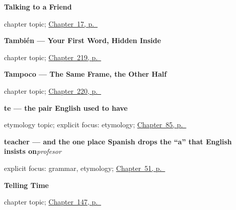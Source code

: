 \noindent\begin{minipage}[t]{\linewidth}
\raggedright
\textbf{Talking to a Friend}\par
\footnotesize chapter topic; \hyperref[ch:hablas]{Chapter~17, p.~\pageref*{ch:hablas}}
\end{minipage}\par\smallskip

\noindent\begin{minipage}[t]{\linewidth}
\raggedright
\textbf{También --- Your First Word, Hidden Inside}\par
\footnotesize chapter topic; \hyperref[ch:tambien]{Chapter~219, p.~\pageref*{ch:tambien}}
\end{minipage}\par\smallskip

\noindent\begin{minipage}[t]{\linewidth}
\raggedright
\textbf{Tampoco --- The Same Frame, the Other Half}\par
\footnotesize chapter topic; \hyperref[ch:tampoco]{Chapter~220, p.~\pageref*{ch:tampoco}}
\end{minipage}\par\smallskip

\noindent\begin{minipage}[t]{\linewidth}
\raggedright
\textbf{te — the pair English used to have}\par
\footnotesize etymology topic; explicit focus: etymology; \hyperref[ch:pronoun-me-te]{Chapter~85, p.~\pageref*{ch:pronoun-me-te}}
\end{minipage}\par\smallskip

\noindent\begin{minipage}[t]{\linewidth}
\raggedright
\textbf{teacher — and the one place Spanish drops the \textquotedblleft{}a\textquotedblright{} that English insists on}\enspace\emph{profesor}\par
\footnotesize explicit focus: grammar, etymology; \hyperref[ch:profesor]{Chapter~51, p.~\pageref*{ch:profesor}}
\end{minipage}\par\smallskip

\noindent\begin{minipage}[t]{\linewidth}
\raggedright
\textbf{Telling Time}\par
\footnotesize chapter topic; \hyperref[ch:spanish-telling-time]{Chapter~147, p.~\pageref*{ch:spanish-telling-time}}
\end{minipage}\par\smallskip

